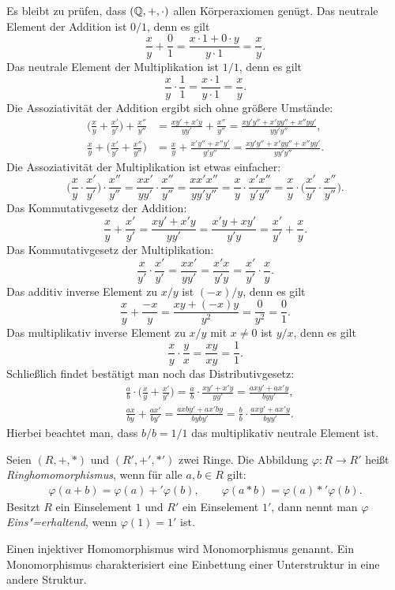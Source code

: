Es bleibt zu prüfen, dass $(\mathbb Q,+,\cdot)$ allen Körperaxiomen genügt.
Das neutrale Element der Addition ist $0/1$, denn es gilt
\[\frac{x}{y}+\frac{0}{1} = \frac{x\cdot 1+0\cdot y}{y\cdot 1} = \frac{x}{y}.\]
Das neutrale Element der Multiplikation ist $1/1$, denn es gilt
\[\frac{x}{y}\cdot\frac{1}{1} = \frac{x\cdot 1}{y\cdot 1} = \frac{x}{y}.\]
Die Assoziativität der Addition ergibt sich ohne größere Umstände:
\begin{align*}
\bigg(\frac{x}{y}+\frac{x'}{y'}\bigg)+\frac{x''}{y''}
&= \frac{xy'+x'y}{yy'} + \frac{x''}{y''}
= \frac{xy'y''+x'yy''+x''yy'}{yy'y''},\\
\frac{x}{y}+\bigg(\frac{x'}{y'}+\frac{x''}{y''}\bigg)
&= \frac{x}{y}+\frac{x'y''+x''y'}{y'y''}
= \frac{xy'y''+x'yy''+x''yy'}{yy'y''}.
\end{align*}
Die Assoziativität der Multiplikation ist etwas einfacher:
\[\bigg(\frac{x}{y}\cdot\frac{x'}{y'}\bigg)\cdot\frac{x''}{y''}
= \frac{xx'}{yy'}\cdot\frac{x''}{y''} = \frac{xx'x''}{yy'y''}
= \frac{x}{y}\cdot\frac{x'x''}{y'y''}
= \frac{x}{y}\cdot\bigg(\frac{x'}{y'}\cdot\frac{x''}{y''}\bigg).\]
Das Kommutativgesetz der Addition:
\[\frac{x}{y}+\frac{x'}{y'} = \frac{xy'+x'y}{yy'}
= \frac{x'y+xy'}{y'y}
= \frac{x'}{y'}+\frac{x}{y}.\]
Das Kommutativgesetz der Multiplikation:
\[\frac{x}{y'}\cdot\frac{x'}{y'}
= \frac{xx'}{yy'} = \frac{x'x}{y'y}
= \frac{x'}{y'}\cdot\frac{x}{y}.\]
Das additiv inverse Element zu $x/y$ ist $(-x)/y$, denn es gilt
\[\frac{x}{y}+\frac{-x}{y} = \frac{xy+(-x)y}{y^2}
= \frac{0}{y^2} = \frac{0}{1}.\]
Das multiplikativ inverse Element zu $x/y$ mit $x\ne 0$
ist $y/x$, denn es gilt
\[\frac{x}{y}\cdot\frac{y}{x} = \frac{xy}{xy} = \frac{1}{1}.\]
Schließlich findet bestätigt man noch das Distributivgesetz:
\begin{align*}
&\frac{a}{b}\cdot\bigg(\frac{x}{y}+\frac{x'}{y'}\bigg)
= \frac{a}{b}\cdot\frac{xy'+x'y}{yy'}
= \frac{axy'+ax'y}{byy'},\\
&\frac{ax}{by}+\frac{ax'}{by'}
= \frac{axby'+ax'by}{byby'}
= \frac{b}{b}\cdot\frac{axy'+ax'y}{byy'}.
\end{align*}
Hierbei beachtet man, dass $b/b=1/1$ das multiplikativ
neutrale Element ist.\;\qedsymbol

\begin{Definition}[Ringhomomorphismus]\newlinefirst
Seien $(R,+,*)$ und $(R',+',*')$ zwei Ringe. Die Abbildung
$\varphi\colon R\to R'$ heißt \emph{Ringhomomorphismus}, wenn für alle
$a,b\in R$ gilt:
\begin{align*}
\varphi(a+b) = \varphi(a)+'\varphi(b),\qquad
\varphi(a*b) = \varphi(a)*'\varphi(b).
\end{align*}
Besitzt $R$ ein Einselement $1$ und $R'$ ein Einselement $1'$,
dann nennt man $\varphi$ \emph{Eins"=erhaltend}, wenn $\varphi(1)=1'$ ist.
\end{Definition}
Einen injektiver Homomorphismus wird Monomorphismus genannt. Ein
Monomorphismus charakterisiert eine Einbettung einer Unterstruktur
in eine andere Struktur.

